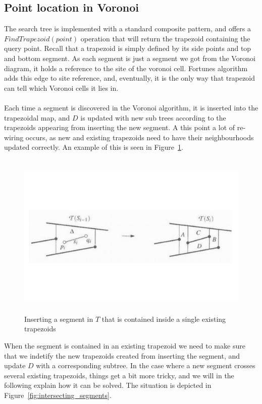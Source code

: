 \subsection{Point location in Voronoi}
The search tree is implemented with a standard composite pattern, and offers a $FindTrapezoid(point)$ operation that will return the trapezoid containing the query point.  Recall that a trapezoid is simply defined by its side points and top and bottom segment. As each segment is just a segment we got from the Voronoi diagram, it holds a reference to the site of the voronoi cell. Fortunes algorithm adds this edge to site reference, and, eventually, it is the only way that trapezoid can tell which Voronoi cells it lies in. 

\paragraph{}
Each time a segment is discovered in the Voronoi algorithm, it is inserted into the trapezoidal map, and $D$ is updated with new sub trees according to the trapezoids appearing from inserting the new segment. A this point a lot of re-wiring occurs, as new and existing trapezoids need to have their neighbourhoods updated correctly. An example of this is seen in Figure~\ref{fig:contained_segment}. 

\begin{figure}[t]
    \centering
      \includegraphics[height=80mm]{images/contained_segment.pdf}
    \caption{Inserting a segment in $T$ that is contained inside a single existing trapezoids}
    \label{fig:contained_segment}
\end{figure}

When the segment is contained in an existing trapezoid we need to make sure that we indetify the new trapezoids created from inserting the segment, and update $D$ with a corresponding subtree. In the case where a new segment crosses several existing trapezoids, things get a bit more tricky, and we will in the following explain how it can be solved. The situation is depicted in Figure~\ref{fig:intersecting_segments}.\paragraph{}

